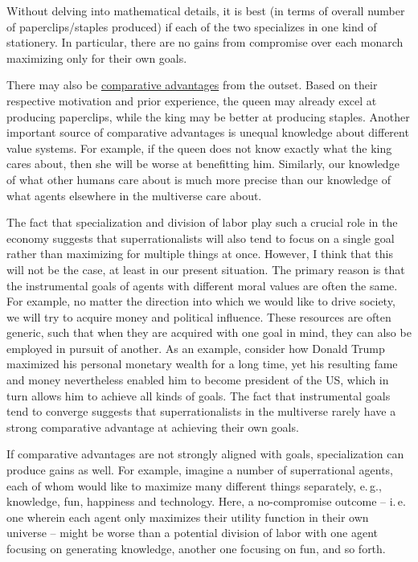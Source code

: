 Without delving into mathematical details, it is best (in terms of
overall number of paperclips/staples produced) if each of the two
specializes in one kind of stationery. In particular, there are no gains
from compromise over each monarch maximizing only for their own goals.

There may also be
\href{https://en.wikipedia.org/wiki/Comparative_advantage}{comparative
advantages} from the outset. Based on their respective motivation and
prior experience, the queen may already excel at producing paperclips,
while the king may be better at producing staples. Another important
source of comparative advantages is unequal knowledge about different
value systems. For example, if the queen does not know exactly what the
king cares about, then she will be worse at benefitting him. Similarly,
our knowledge of what other humans care about is much more precise than
our knowledge of what agents elsewhere in the multiverse care about.

The fact that specialization and division of labor play such a crucial
role in the economy suggests that superrationalists will also tend to
focus on a single goal rather than maximizing for multiple things at
once. However, I think that this will not be the case, at least in our
present situation. The primary reason is that the instrumental goals of
agents with different moral values are often the same. For example, no
matter the direction into which we would like to drive society, we will
try to acquire money and political influence. These resources are often
generic, such that when they are acquired with one goal in mind, they
can also be employed in pursuit of another. As an example, consider how
Donald Trump maximized his personal monetary wealth for a long time, yet
his resulting fame and money nevertheless enabled him to become
president of the US, which in turn allows him to achieve all kinds of
goals. The fact that instrumental goals tend to converge suggests that
superrationalists in the multiverse rarely have a strong comparative
advantage at achieving their own goals.

If comparative advantages are not strongly aligned with goals,
specialization can produce gains as well. For example, imagine a number
of superrational agents, each of whom would like to maximize many
different things separately, e.\,g., knowledge, fun, happiness and
technology. Here, a no-compromise outcome -- i.\,e. one wherein each agent
only maximizes their utility function in their own universe -- might be
worse than a potential division of labor with one agent focusing on
generating knowledge, another one focusing on fun, and so forth.

